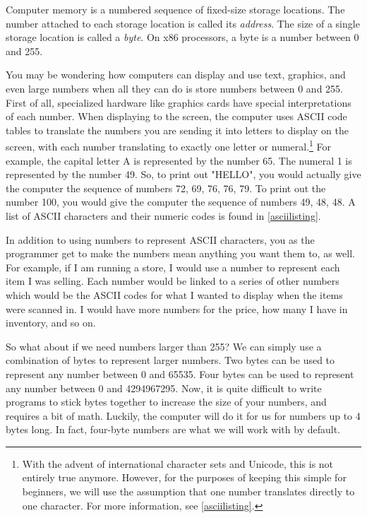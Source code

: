 Computer memory is a numbered sequence of fixed-size storage locations.  
The number attached to each storage location is called its 
\emph{address}.  The size of a single storage location
is called a \emph{byte}.  On x86 processors, a byte 
is a number between 0 and 255.  

You may be wondering how computers can display and use text, graphics,
and even large numbers when all they can do is store numbers between
0 and 255.  First of all, specialized hardware like graphics cards have special interpretations of
each number.  When displaying to the screen, the computer uses 
ASCII code tables to translate the numbers you are sending it
into letters to display on the screen, with each number translating to
exactly one letter or numeral.\footnote{With the advent of international
character sets and Unicode, this is not entirely true anymore.  However, for
the purposes of keeping this simple for beginners, we will use the assumption
that one number translates directly to one character.  For more information,
see \autoref{asciilisting}.}  For example, 
the capital letter A is 
represented by the number 65.   The numeral 1 is represented by the
number 49.  So, to print out "HELLO", you would actually give the
computer the sequence of numbers 72, 69, 76, 76, 79.  To print out
the number 100, you would give the computer the sequence of numbers
49, 48, 48.  A list of ASCII characters and their numeric codes
is found in \autoref{asciilisting}.

In addition to using numbers to represent ASCII characters, you as the 
programmer get to make the numbers mean anything you want them to, as well.  
For example, if I am running a store, I would use a number to represent 
each item I was selling.  Each number would be linked to a series of 
other numbers which would be the ASCII codes for what I wanted to display 
when the items were scanned in.  I would have more numbers for the price, 
how many I have in inventory, and so on.

So what about if we need numbers larger than 255?  We can simply use
a combination of bytes to represent larger numbers.  Two bytes can
be used to represent any number between 0 and 65535.  Four bytes
can be used to represent any number between 0 and 4294967295.  Now, it
is quite difficult to write programs to stick bytes together to increase
the size of your numbers, and requires a bit of math.  Luckily, the computer
will do it for us for numbers up to 4 bytes long.  In fact, four-byte numbers
are what we will work with by default.

